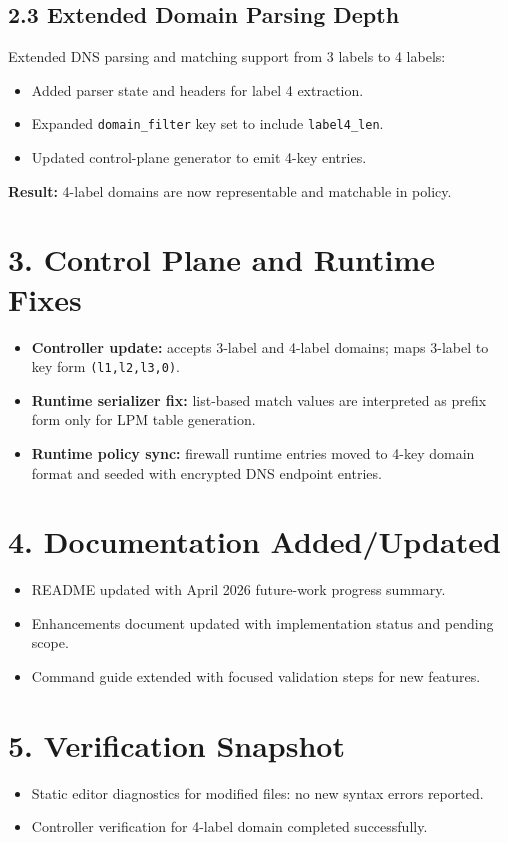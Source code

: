 \documentclass[11pt,a4paper]{article}
\begin{document}
\subsection*{2.3 Extended Domain Parsing Depth}
Extended DNS parsing and matching support from 3 labels to 4 labels:
\begin{itemize}
    \item Added parser state and headers for label 4 extraction.
    \item Expanded \texttt{domain\_filter} key set to include \texttt{label4\_len}.
    \item Updated control-plane generator to emit 4-key entries.
\end{itemize}

\textbf{Result:} 4-label domains are now representable and matchable in policy.

\section*{3. Control Plane and Runtime Fixes}
\begin{itemize}
    \item \textbf{Controller update:} accepts 3-label and 4-label domains; maps 3-label to key form \texttt{(l1,l2,l3,0)}.
    \item \textbf{Runtime serializer fix:} list-based match values are interpreted as prefix form only for LPM table generation.
    \item \textbf{Runtime policy sync:} firewall runtime entries moved to 4-key domain format and seeded with encrypted DNS endpoint entries.
\end{itemize}

\section*{4. Documentation Added/Updated}
\begin{itemize}
    \item README updated with April 2026 future-work progress summary.
    \item Enhancements document updated with implementation status and pending scope.
    \item Command guide extended with focused validation steps for new features.
\end{itemize}

\section*{5. Verification Snapshot}
\begin{itemize}
    \item Static editor diagnostics for modified files: no new syntax errors reported.
    \item Controller verification for 4-label domain completed successfully.
\end{itemize}
\end{document}
